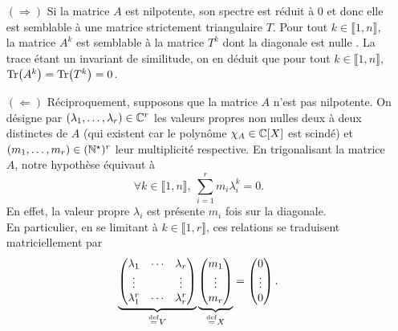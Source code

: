 \begin{preuve}
    \begin{itemize}
        \item[$(\Rightarrow)$] Si la matrice $A$ est nilpotente, son spectre est réduit à $0$ et donc elle est semblable à une matrice strictement triangulaire $T$. Pour tout $k \in \llbracket 1, n \rrbracket$, la matrice $A^k$ est semblable à la matrice $T^k$ dont la diagonale est nulle \note. La trace étant un invariant de similitude, on en déduit que pour tout $k \in \llbracket 1, n \rrbracket$, $\Tr(A^k) = \Tr(T^k) = 0$.
        \item[$(\Leftarrow)$] Réciproquement, supposons que la matrice $A$ n'est pas nilpotente. On désigne par $(\lambda_1, \dots, \lambda_r) \in \mathbb{C}^r$ les valeurs propres non nulles deux à deux distinctes de $A$ (qui existent car le polynôme $\chi_A \in \mathbb{C}[X]$ est scindé) et $(m_1, \dots, m_r) \in (\mathbb{N}^\star)^r$ leur multiplicité respective. En trigonalisant la matrice $A$, notre hypothèse équivaut à
        $$\forall k \in \llbracket 1, n \rrbracket,\ \sum_{i=1}^r m_i \lambda_i^k = 0.$$
        En effet, la valeur propre $\lambda_i$ est présente $m_i$ fois sur la diagonale. \\
        En particulier, en se limitant à $k \in \llbracket 1, r \rrbracket$, ces relations se traduisent matriciellement par
        $$
        \underbrace{
        \begin{pmatrix}
        \lambda_1 & \cdots & \lambda_r \\
        \vdots & & \vdots \\
        \lambda_1^r & \cdots & \lambda_r^r
        \end{pmatrix}
        }_{\overset{\mathrm{\tiny def}}{=} V}
        \underbrace{
        \begin{pmatrix}
            m_1 \\ \vdots \\ m_r
        \end{pmatrix}
        }_{\overset{\mathrm{\tiny def}}{=} X}
        = 
        \begin{pmatrix}
        0 \\ \vdots \\ 0
        \end{pmatrix}.
        $$
        

\end{itemize}
\end{preuve}
